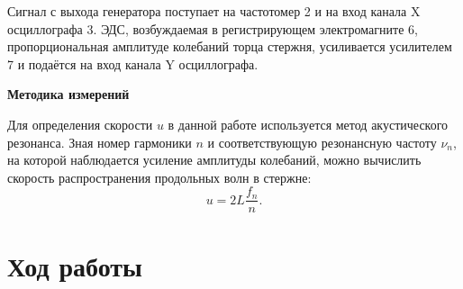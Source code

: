 \documentclass[a4paper,12 pt]{article}
\begin{document}
Сигнал с выхода генератора поступает на частотомер 2 и на вход канала X осциллографа 3. ЭДС, возбуждаемая в регистрирующем электромагните 6, пропорциональная амплитуде колебаний торца стержня, усиливается усилителем 7 и подаётся на вход канала Y осциллографа.

\textbf{Методика измерений}

Для определения скорости $u$ в данной работе используется
метод акустического резонанса. Зная номер гармоники $n$ и соответствующую резонансную частоту $\nu_n$, на которой наблюдается усиление амплитуды колебаний,
можно вычислить скорость распространения продольных волн в стержне:
\begin{equation}
    u = 2L \frac{f_n}{n}.
\end{equation}



\section{Ход работы}
\end{document}

